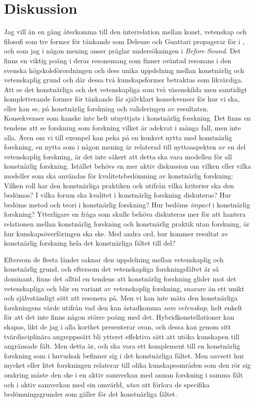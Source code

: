 \documentclass[11pt]{article}
\begin{document}
\section{Diskussion}
\label{sec:org3173211}
Jag vill än en gång återkomma till den interrelation mellan konst,
vetenskap och filosofi som tre former för tänkande som Deleuze och
Guattari propagerar för i , och som jag i någon mening anser präglar
undersökningen i \emph{Before Sound}. Det finns en viktig poäng i deras
resonemang som finner oväntad resonans i den svenska
högskoleförordningen och dess unika uppdelning mellan konstnärlig och
vetenskaplig grund och där dessa två kunskapsformer betraktas som
likvärdiga. Att se det konstnärliga och det vetenskapliga som två
väsenskilda men samtidigt kompletterande former för tänkande får
självklart konsekvenser för hur vi ska, eller kan se, på konstnärlig
forskning och valideringen av resultaten. Konsekvenser som kanske inte
helt utnyttjats i konstnärlig forskning. Det finns en tendens att se
forskning som forskning vilket är adekvat i många fall, men inte alla.
Även om vi till exempel kan peka på en konkret nytta med konstnärlig
forskning, en nytta som i någon mening är relaterad till nyttoaspekten
av en del vetenskaplig forskning, är det inte säkert att detta ska vara
modellen för all konstnärlig forskning. Istället behövs en mer aktiv
diskussion om vilken eller vilka modeller som ska användas för
kvalitetsbedömning av konstnärlig forskning: Vilken roll har den
konstnärliga praktiken och utifrån vilka kriterier ska den bedömas? I
vilka forum ska kvalitet i konstnärlig forskning diskuteras? Hur bedöms
metod och teori i konstnärlig forskning? Hur bedöms \emph{impact} i
konstnärlig forskning? Ytterligare en fråga som skulle behöva diskuteras
mer för att hantera relationen mellan konstnärlig forskning och
konstnärlig praktik utan forskning, är hur kunskapsöverföringen ska ske.
Med andra ord, hur kommer resultat av konstnärlig forskning hela det
konstnärliga fältet till del?

Eftersom de flesta länder saknar den uppdelning mellan vetenskaplig och
konstnärlig grund, och eftersom det vetenskapliga forskningsfältet är så
dominant, finns det alltid en tendens att konstnärlig forskning glider
mot det vetenskapliga och blir en variant av vetenskaplig forskning,
snarare än ett unikt och självständigt sätt att resonera på. Men vi kan
inte mäta den konstnärliga forskningens värde utifrån vad den kan
åstadkomma \emph{som vetenskap}, helt enkelt för att det inte finns någon
större poäng med det. Hybridkonstellationer kan skapas, likt de jag i
alla korthet presenterar ovan, och dessa kan genom sitt tvärdisciplinära
angreppssätt bli ytterst effektiva sätt att utöka kunskapen till
angränsade fält. Men detta är, och ska vara ett komplement till en
konstnärlig forskning som i huvudsak befinner sig i det konstnärliga
fältet. Men oavsett hur mycket eller litet forskningen relaterar till
olika kunskapsområden som den rör sig omkring måste den ske i en aktiv
samverkan med annan forskning i samma fält och i aktiv samverkan med sin
omvärld, \emph{utan} att förlora de specifika bedömningsgrunder som gäller
för det konstnärliga fältet.
\end{document}
